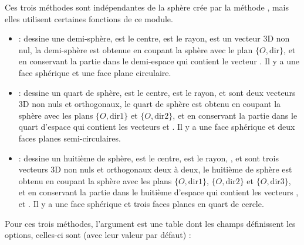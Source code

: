 Ces trois méthodes sont indépendantes de la sphère crée par la méthode , mais elles utilisent certaines fonctions de ce module.

\begin{itemize}
    \item {} : dessine une demi-sphère,  est le centre,  est le rayon,  est un vecteur 3D non nul, la demi-sphère est obtenue en coupant la sphère avec le plan $\{O,\mathrm{dir}\}$, et en conservant la partie dans le demi-espace qui contient le vecteur . Il y a une face sphérique et une face plane circulaire.
    
    \item {} : dessine un quart de sphère,  est le centre,  est le rayon,  et  sont deux vecteurs 3D non nuls et orthogonaux, le quart de sphère est obtenu en coupant la sphère avec les plans $\{O,\mathrm{dir1}\}$ et $\{O,\mathrm{dir2}\}$, et en conservant la partie dans le quart d'espace qui contient les vecteurs  et . Il y a une face sphérique et deux faces planes semi-circulaires.
    
    \item {} : dessine un huitième de sphère,  est le centre,  est le rayon, ,  et  sont trois vecteurs 3D non nuls et orthogonaux deux à deux, le huitième de sphère est obtenu en coupant la sphère avec les plans $\{O,\mathrm{dir1}\}$, $\{O,\mathrm{dir2}\}$ et $\{O,\mathrm{dir3}\}$, et en conservant la partie dans le huitième d'espace qui contient les vecteurs ,  et . Il y a une face sphérique et trois faces planes en quart de cercle.
\end{itemize}

Pour ces trois méthodes, l'argument  est une table dont les champs définissent les options, celles-ci sont (avec leur valeur par défaut) :

